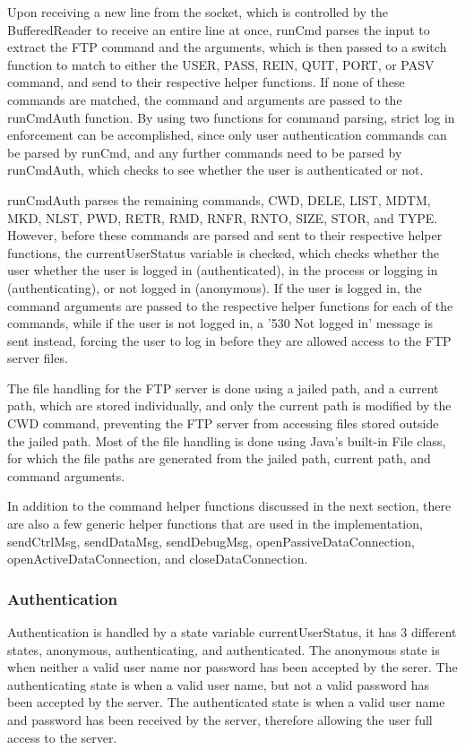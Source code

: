 \documentclass[11pt,a4paper,titlepage]{article}
\begin{document}
Upon receiving a new line from the socket, which is controlled by the BufferedReader to receive an entire line at once, runCmd parses the input to extract the FTP command and the arguments, which is then passed to a switch function to match to either the USER, PASS, REIN, QUIT, PORT, or PASV command, and send to their respective helper functions. If none of these commands are matched, the command and arguments are passed to the runCmdAuth function. By using two functions for command parsing, strict log in enforcement can be accomplished, since only user authentication commands can be parsed by runCmd, and any further commands need to be parsed by runCmdAuth, which checks to see whether the user is authenticated or not.

runCmdAuth parses the remaining commands, CWD, DELE, LIST, MDTM, MKD, NLST, PWD, RETR, RMD, RNFR, RNTO, SIZE, STOR, and TYPE. However, before these commands are parsed and sent to their respective helper functions, the currentUserStatus variable is checked, which checks whether the user whether the user is logged in (authenticated), in the process or logging in (authenticating), or not logged in (anonymous). If the user is logged in, the command arguments are passed to the respective helper functions for each of the commands, while if the user is not logged in, a '530 Not logged in' message is sent instead, forcing the user to log in before they are allowed access to the FTP server files.

The file handling for the FTP server is done using a jailed path, and a current path, which are stored individually, and only the current path is modified by the CWD command, preventing the FTP server from accessing files stored outside the jailed path. Most of the file handling is done using Java's built-in File class, for which the file paths are generated from the jailed path, current path, and command arguments.

In addition to the command helper functions discussed in the next section, there are also a few generic helper functions that are used in the implementation, sendCtrlMsg, sendDataMsg, sendDebugMsg, openPassiveDataConnection, openActiveDataConnection, and closeDataConnection.

\subsubsection{Authentication}
Authentication is handled by a state variable currentUserStatus, it has 3 different states, anonymous, authenticating, and authenticated. The anonymous state is when neither a valid user name nor password has been accepted by the serer. The authenticating state is when a valid user name, but not a valid password has been accepted by the server. The authenticated state is when a valid user name and password has been received by the server, therefore allowing the user full access to the server.
\end{document}
